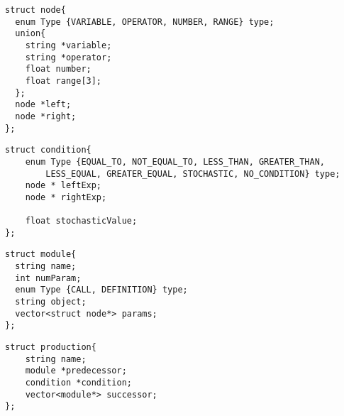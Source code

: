 \begin{singlespace}
\newpage

\lstset{language=C}
\lstset{morekeywords=string}

\begin{lstlisting}[frame=single] 
struct node{
  enum Type {VARIABLE, OPERATOR, NUMBER, RANGE} type;
  union{
  	string *variable; 
  	string *operator; 
  	float number;
  	float range[3];
  };
  node *left; 
  node *right; 
};
\end{lstlisting}

\lstset{morekeywords=vector}
\lstset{morekeywords=node}

\begin{lstlisting}[frame=single] 
struct condition{
    enum Type {EQUAL_TO, NOT_EQUAL_TO, LESS_THAN, GREATER_THAN, 
    	LESS_EQUAL, GREATER_EQUAL, STOCHASTIC, NO_CONDITION} type;
    node * leftExp;
    node * rightExp;

    float stochasticValue;
};
\end{lstlisting}

\lstset{morekeywords=condition}

\begin{lstlisting}[frame=single] 
struct module{
  string name;
  int numParam; 
  enum Type {CALL, DEFINITION} type;
  string object; 
  vector<struct node*> params;
};
\end{lstlisting}

\lstset{morekeywords=module}

\begin{lstlisting}[frame=single] 
struct production{
    string name;
    module *predecessor;
    condition *condition;
    vector<module*> successor;
};
\end{lstlisting}


\end{singlespace}
